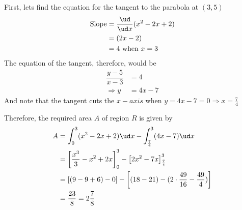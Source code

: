 \begin{solution}
   First, lets find the equation for the tangent to the parabola at $(3,5)$
   \begin{align}
      \text{Slope} &= \dfrac{\ud}{\ud x}(x^2-2x+2) \\
                   &= (2x-2) \\
                   &= 4 \text{ when } x = 3
   \end{align}
   The equation of the tangent, therefore, would be 
   \begin{align}
       \dfrac{y-5}{x-3} &= 4 \\
       \Rightarrow y &= 4x - 7
   \end{align}
   And note that the tangent cuts the $x-axis$ when $y = 4x - 7 = 0 \Rightarrow x = \frac{7}{4}$
   
   Therefore, the required area $A$ of region $R$ is given by
   \begin{align}
      A &= \int_0^3 (x^2-2x+2)\ud x - \int_{\frac{7}{4}}^3 (4x - 7) \ud x \\
        &= \left[ \dfrac{x^3}{3}-x^2+2x\right]_0^3 - \left[ 2x^2-7x \right]_{\frac{7}{4}}^3 \\
        &= \left[(9-9+6)-0 \right] - \left[(18-21)-(2\cdot\frac{49}{16}-\frac{49}{4}) \right] \\
        &= \frac{23}{8} = 2\frac{7}{8}
   \end{align}
\end{solution}
